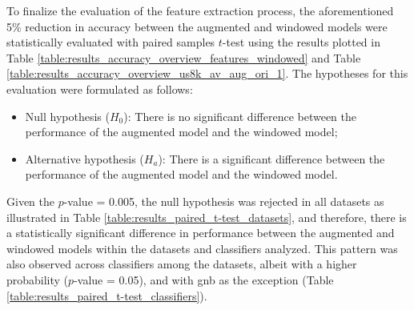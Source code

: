 
To finalize the evaluation of the feature extraction process, the aforementioned 5\% reduction in accuracy between the augmented and windowed models were statistically evaluated with paired samples $t$-test using the results plotted in Table \ref{table:results_accuracy_overview_features_windowed} and Table \ref{table:results_accuracy_overview_us8k_av_aug_ori_1}. The hypotheses for this evaluation were formulated as follows:

\begin{itemize}
    \item Null hypothesis ($H_0$): There is no significant difference between the performance of the augmented model and the windowed model;
    \item Alternative hypothesis ($H_a$): There is a significant difference between the performance of the augmented model and the windowed model.
\end{itemize}

Given the $p$-value = 0.005, the null hypothesis was rejected in all datasets as illustrated in Table \ref{table:results_paired_t-test_datasets}, and therefore, there is a statistically significant difference in performance between the augmented and windowed models within the datasets and classifiers analyzed. This pattern was also observed across classifiers among the datasets, albeit with a higher probability ($p$-value = 0.05), and with \gls{gnb} as the exception (Table \ref{table:results_paired_t-test_classifiers}).


